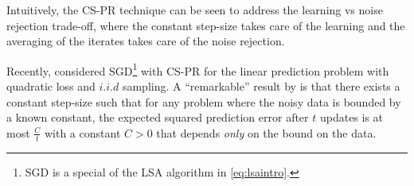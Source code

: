 Intuitively, the CS-PR technique can be seen to address the learning vs noise rejection trade-off, where the constant step-size takes care of the learning  and the averaging of the iterates takes care of the noise rejection. \par
Recently, \cite{bach} considered SGD\footnote{SGD is a special of the LSA algorithm in \eqref{eq:lsaintro}.} with CS-PR for the linear prediction problem with quadratic loss and $i.i.d$ sampling. A ``remarkable'' result by \cite{bach} is that there exists a constant step-size such that for any problem where the noisy data is bounded by a known constant, the expected squared prediction error after $t$ updates is at most $\frac{C}{t}$ with a constant $C>0$ that depends \emph{only} on the bound on the data.\par{}
